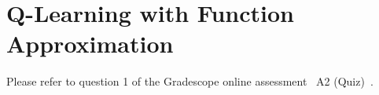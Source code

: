 \section{Q-Learning with Function Approximation}

Please refer to question 1 of the Gradescope online assessment ~A2 (Quiz)~.
